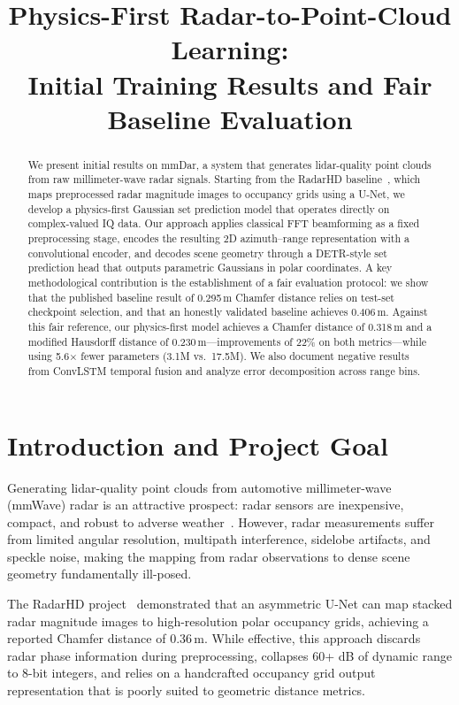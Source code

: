 \documentclass[conference]{IEEEtran}
\title{Physics-First Radar-to-Point-Cloud Learning:\\Initial Training Results and Fair Baseline Evaluation}
\author{
\IEEEauthorblockN{Chris Turner, Andreas Zeck, Justin Palm}
\IEEEauthorblockA{
ELEC-6970: Applied Statistics and Machine Learning\\
Auburn University\\
\{cmt0106, azeck, jlp0102\}@auburn.edu
}
}
\begin{document}
\maketitle

\begin{abstract}
We present initial results on mmDar, a system that generates lidar-quality point clouds from raw millimeter-wave radar signals.
Starting from the RadarHD baseline~\cite{prabhakara2023radarhd}, which maps preprocessed radar magnitude images to occupancy grids using a U-Net, we develop a physics-first Gaussian set prediction model that operates directly on complex-valued IQ data.
Our approach applies classical FFT beamforming as a fixed preprocessing stage, encodes the resulting 2D azimuth--range representation with a convolutional encoder, and decodes scene geometry through a DETR-style set prediction head that outputs parametric Gaussians in polar coordinates.
A key methodological contribution is the establishment of a fair evaluation protocol: we show that the published baseline result of 0.295\,m Chamfer distance relies on test-set checkpoint selection, and that an honestly validated baseline achieves 0.406\,m.
Against this fair reference, our physics-first model achieves a Chamfer distance of 0.318\,m and a modified Hausdorff distance of 0.230\,m---improvements of 22\% on both metrics---while using 5.6$\times$ fewer parameters (3.1M vs.\ 17.5M).
We also document negative results from ConvLSTM temporal fusion and analyze error decomposition across range bins.
\end{abstract}

\section{Introduction and Project Goal}

Generating lidar-quality point clouds from automotive millimeter-wave (mmWave) radar is an attractive prospect: radar sensors are inexpensive, compact, and robust to adverse weather~\cite{hunt2024radcloud}.
However, radar measurements suffer from limited angular resolution, multipath interference, sidelobe artifacts, and speckle noise, making the mapping from radar observations to dense scene geometry fundamentally ill-posed.

The RadarHD project~\cite{prabhakara2023radarhd} demonstrated that an asymmetric U-Net can map stacked radar magnitude images to high-resolution polar occupancy grids, achieving a reported Chamfer distance of 0.36\,m.
While effective, this approach discards radar phase information during preprocessing, collapses 60+ dB of dynamic range to 8-bit integers, and relies on a handcrafted occupancy grid output representation that is poorly suited to geometric distance metrics.
\end{document}
